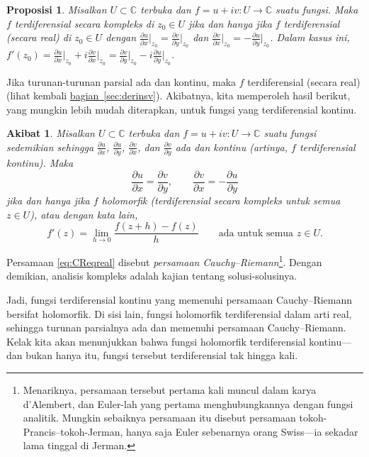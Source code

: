 \documentclass[12pt,openany]{book}
\newcommand{\C}{{\mathbb{C}}}
\newcommand{\myindex}[1]{#1\index{#1}}
\theoremstyle{plain}
\newtheorem{prop}[thm]{Proposisi}
\newtheorem{cor}[thm]{Akibat}
\theoremstyle{remark}
\theoremstyle{definition}
\theoremstyle{exercise}
\theoremstyle{example}
\newcommand{\sectionref}[1]{\hyperref[#1]{bagian~\ref*{#1}}}
\begin{document}
\begin{prop}
Misalkan $U \subset \C$ terbuka dan $f = u+iv \colon U \to \C$ suatu fungsi.
Maka
$f$ terdiferensial secara kompleks di $z_0 \in U$
jika dan hanya jika
$f$ terdiferensial (secara real) di $z_0 \in U$
dengan
$\frac{\partial u}{\partial x}\big|_{z_0} =
\frac{\partial v}{\partial y}\big|_{z_0}$
dan
$\frac{\partial v}{\partial x}\big|_{z_0} =
-\frac{\partial u}{\partial y}\big|_{z_0}$.
Dalam kasus ini,
$f'(z_0) = 
\frac{\partial u}{\partial x}\big|_{z_0} + i \frac{\partial v}{\partial
x}\big|_{z_0} = \frac{\partial v}{\partial y}\big|_{z_0} - i \frac{\partial
u}{\partial y}\big|_{z_0}$.
\end{prop}

Jika turunan-turunan parsial ada dan kontinu, maka $f$
terdiferensial (secara real) (lihat kembali \sectionref{sec:derinsv}).
Akibatnya, kita memperoleh hasil berikut, yang mungkin lebih mudah diterapkan,
untuk fungsi yang terdiferensial kontinu.

\begin{cor}
Misalkan $U \subset \C$ terbuka dan $f = u+iv \colon U \to \C$ suatu fungsi
sedemikian sehingga $\frac{\partial u}{\partial x}$, $\frac{\partial u}{\partial y}$, $\frac{\partial
v}{\partial x}$, dan $\frac{\partial v}{\partial y}$ ada dan kontinu (artinya,
$f$ terdiferensial kontinu).
Maka
\begin{equation} \label{eq:CReqreal}
\frac{\partial u}{\partial x} = \frac{\partial v}{\partial y} , \qquad
\frac{\partial v}{\partial x} = -\frac{\partial u}{\partial y}
\end{equation}
jika dan hanya jika $f$ holomorfik (terdiferensial secara kompleks untuk semua $z \in U$),
atau dengan kata lain,
\begin{equation*}
f'(z) =
\lim_{h \to 0} \frac{f(z+h) - f(z)}{h}
\qquad
\text{ada untuk semua $z \in U$.}
\end{equation*}
\end{cor}

Persamaan \eqref{eq:CReqreal} disebut
\emph{\myindex{persamaan Cauchy--Riemann}}\footnote{Menariknya,
persamaan tersebut pertama kali muncul dalam karya d'Alembert, dan
Euler-lah yang pertama menghubungkannya dengan fungsi analitik.
Mungkin sebaiknya persamaan itu disebut persamaan tokoh-Prancis--tokoh-Jerman,
hanya saja Euler sebenarnya orang Swiss---ia sekadar lama tinggal di Jerman.}.
Dengan demikian, analisis kompleks adalah kajian tentang solusi-solusinya.

Jadi, fungsi terdiferensial kontinu yang memenuhi
persamaan Cauchy--Riemann bersifat holomorfik.
Di sisi lain,
fungsi holomorfik terdiferensial dalam arti real,
sehingga turunan parsialnya ada dan memenuhi persamaan Cauchy--Riemann.
Kelak kita akan menunjukkan bahwa fungsi holomorfik
terdiferensial kontinu---dan bukan hanya itu, fungsi tersebut
terdiferensial tak hingga kali.
\end{document}
